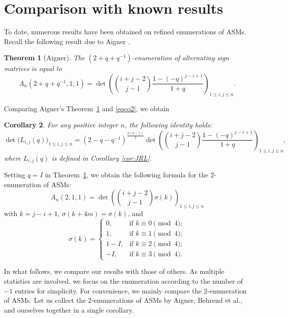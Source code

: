 \documentclass[12pt, a4paper]{amsart} %
\numberwithin{equation}{section}
\newtheorem{theorem}{Theorem}[section]
\newtheorem{corollary}[theorem]{Corollary}
\begin{document}

\section{Comparison with known results}\label{sec:comparison} %
To date, numerous results have been obtained on refined enumerations of ASMs. 
Recall the following result due to Aigner \cite{Ai21}. 
\begin{theorem}[Aigner]\label{ai}
    The $(2 + q + q^{-1})$-enumeration of alternating sign matrices is equal to
    \begin{equation*}
			A_n(2+q+q^{-1},1,1) =  \det{\left(\binom{i+j-2}{j-1}\frac{1-(-q)^{j-i+1}}{1+q}\right)_{1 \le i,j \le n}}.
    \end{equation*}
\end{theorem}
Comparing Aigner's Theorem~\ref{ai} and \eqref{eqco2}, we obtain 
\begin{corollary} For any positive integer $n$, the following identity holds:
\begin{equation*}
	 \det{\bigl(L_{i,j}(q)\bigr)_{1 \le i,j \le n}} 
    = {(2-q-q^{-1})^{\frac{n(n-1)}{2}}}
		\det{\left(\binom{i+j-2}{j-1}\frac{1-(-q)^{j-i+1}}{1+q}\right)_{1 \le i,j \le n}},
\end{equation*}
where $L_{i,j}(q)$ is defined in Corollary \ref{cor:JRL}.
\end{corollary}


Setting $q=I$ in Theorem~\ref{ai}, we obtain the following formula for the $2$-enumeration of ASMs:
\begin{equation*}
		A_n(2,1,1) =  \det{\left(\binom{i+j-2}{j-1}\sigma(k)\right)}_{1 \leq i,j \leq n}
\end{equation*}
    with $k=j-i+1$, $\sigma(k+4m)=\sigma(k)$, and 
    $$
\sigma(k) = 
\begin{cases}
0, & \text{if } k \equiv 0 \pmod{4}; \\
1, & \text{if } k \equiv 1 \pmod{4}; \\
1-I, & \text{if } k \equiv 2 \pmod{4}; \\
-I, & \text{if } k \equiv 3 \pmod{4}.
\end{cases}
$$


In what follows, we compare our results with those of others. 
As multiple statistics are involved, we focus on the enumeration according to the number of $-1$ entries for simplicity. 
For convenience, we mainly compare the $2$-enumeration of ASMs.
Let us collect the $2$-enumerations of ASMs by Aigner, Behrend et al.\cite{BEZ13}, and ourselves together in a single corollary.
\end{document}
